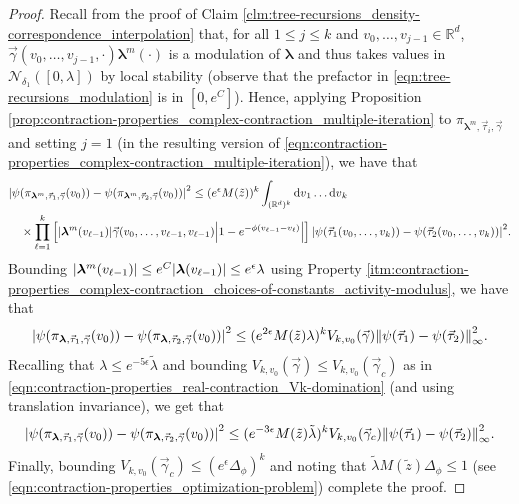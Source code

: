 \documentclass[11pt]{article}
\newcommand{\R}{\mathbb R}
\newcommand{\bl}{\bm{\lambda}}
\newcommand{\pwcc}{\Delta_{\phi}}
\newcommand{\tl}{\tilde{\lambda}}
\newcommand{\tz}{\tilde{z}}
\newcommand{\lsconst}{C}
\numberwithin{equation}{section}
\theoremstyle{plain}
\theoremstyle{definition}
\theoremstyle{remark}
\begin{document}
\begin{proof}
Recall from the proof of Claim \ref{clm:tree-recursions_density-correspondence_interpolation} that, for all $1\le j\le k$ and $v_{0},\dots,v_{j-1}\in\R^{d}$, $\vec{\gamma}(v_{0},\dots,v_{j-1},\cdot)\bl^{m}(\cdot)$ is a modulation of $\bl$ and thus takes values in $\mathcal{N}_{\delta_{1}}([0,\lambda])$ by local stability (observe that the prefactor in \eqref{eqn:tree-recursions_modulation} is in $[0,e^{\lsconst}]$).
Hence, applying Proposition \ref{prop:contraction-properties_complex-contraction_multiple-iteration} to $\pi_{\bl^{m},\vec{\tau}_{i},\vec{\gamma}}$ and setting $j=1$ (in the resulting version of \eqref{eqn:contraction-properties_complex-contraction_multiple-iteration}), we have that
\begin{equation}
\begin{multlined}
\abs{\psi(\pi_{\bl^{m},\vec{\tau}_{1},\vec{\gamma}}(v_{0}))
-\psi(\pi_{\bl^{m},\vec{\tau}_{2},\vec{\gamma}}(v_{0}))}^{2}
\le (e^{\epsilon}M(\tilde{z}))^{k}\int_{(\R^{d})^{k}}\dd{v}_{1}\dots\dd{v}_{k}
\\
\times \prod_{\ell=1}^{k}\left[\abs{\bl^{m}(v_{\ell-1})}\vec{\gamma}(v_{0},\dots,v_{\ell-1},v_{\ell-1})\vphantom{\abs{1-e^{-\phi(v_{\ell-1}-v_{\ell})}}}\abs{1-e^{-\phi(v_{\ell-1}-v_{\ell})}}\right]
\abs{\psi(\vec{\tau}_{1}(v_{0},\dots,v_{k}))-\psi(\vec{\tau}_{2}(v_{0},\dots,v_{k}))}^{2}.
\end{multlined}
\end{equation}
Bounding $\abs{\bl^{m}(v_{\ell-1})}\le e^{\lsconst}\abs{\bl(v_{\ell-1})}\le e^{\epsilon}\lambda$ using Property \ref{itm:contraction-properties_complex-contraction_choices-of-constants_activity-modulus}, we have that
\begin{equation}
\abs{\psi(\pi_{\bl,\vec{\tau}_{1},\vec{\gamma}}(v_{0}))
-\psi(\pi_{\bl,\vec{\tau}_{2},\vec{\gamma}}(v_{0}))}^{2}
\le (e^{2\epsilon}M(\tilde{z})\lambda)^{k}V_{k,v_{0}}(\vec{\gamma})
\norm{\psi(\vec{\tau}_{1})-\psi(\vec{\tau}_{2})}_{\infty}^{2}.
\end{equation}
Recalling that $\lambda\le e^{-5\epsilon}\tl$ and bounding $V_{k,v_{0}}(\vec{\gamma})\le V_{k,v_{0}}(\vec{\gamma}_{c})$ as in \eqref{eqn:contraction-properties_real-contraction_Vk-domination} (and using translation invariance), we get that
\begin{equation}
\abs{\psi(\pi_{\bl,\vec{\tau}_{1},\vec{\gamma}}(v_{0}))
-\psi(\pi_{\bl,\vec{\tau}_{2},\vec{\gamma}}(v_{0}))}^{2}
\le (e^{-3\epsilon}M(\tilde{z})\tl)^{k}V_{k,v_{0}}(\vec{\gamma}_{c})
\norm{\psi(\vec{\tau}_{1})-\psi(\vec{\tau}_{2})}_{\infty}^{2}.
\end{equation}
Finally, bounding $V_{k,v_{0}}(\vec{\gamma}_{c})\le (e^{\epsilon}\pwcc)^{k}$ and noting that $\tl M(\tz)\pwcc\le 1$ (see \eqref{eqn:contraction-properties_optimization-problem}) complete the proof.
\end{proof}
\end{document}

